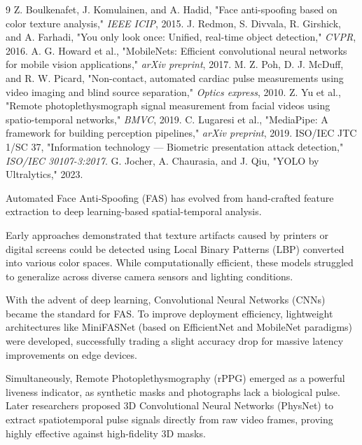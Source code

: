 \documentclass[12pt, a4paper]{report}
\begin{document}
\begin{thebibliography}{9}
 Z. Boulkenafet, J. Komulainen, and A. Hadid, "Face anti-spoofing based on color texture analysis," \textit{IEEE ICIP}, 2015.
 J. Redmon, S. Divvala, R. Girshick, and A. Farhadi, "You only look once: Unified, real-time object detection," \textit{CVPR}, 2016.
 A. G. Howard et al., "MobileNets: Efficient convolutional neural networks for mobile vision applications," \textit{arXiv preprint}, 2017.
 M. Z. Poh, D. J. McDuff, and R. W. Picard, "Non-contact, automated cardiac pulse measurements using video imaging and blind source separation," \textit{Optics express}, 2010.
 Z. Yu et al., "Remote photoplethysmograph signal measurement from facial videos using spatio-temporal networks," \textit{BMVC}, 2019.
 C. Lugaresi et al., "MediaPipe: A framework for building perception pipelines," \textit{arXiv preprint}, 2019.
 ISO/IEC JTC 1/SC 37, "Information technology — Biometric presentation attack detection," \textit{ISO/IEC 30107-3:2017}.
 G. Jocher, A. Chaurasia, and J. Qiu, "YOLO by Ultralytics," 2023.
\end{thebibliography}
\iffalse
Automated Face Anti-Spoofing (FAS) has evolved from hand-crafted feature extraction to deep learning-based spatial-temporal analysis. 

Early approaches demonstrated that texture artifacts caused by printers or digital screens could be detected using Local Binary Patterns (LBP) converted into various color spaces. While computationally efficient, these models struggled to generalize across diverse camera sensors and lighting conditions.

With the advent of deep learning, Convolutional Neural Networks (CNNs) became the standard for FAS. To improve deployment efficiency, lightweight architectures like MiniFASNet (based on EfficientNet and MobileNet paradigms) were developed, successfully trading a slight accuracy drop for massive latency improvements on edge devices.

Simultaneously, Remote Photoplethysmography (rPPG) emerged as a powerful liveness indicator, as synthetic masks and photographs lack a biological pulse. Later researchers proposed 3D Convolutional Neural Networks (PhysNet) to extract spatiotemporal pulse signals directly from raw video frames, proving highly effective against high-fidelity 3D masks.
\end{document}
